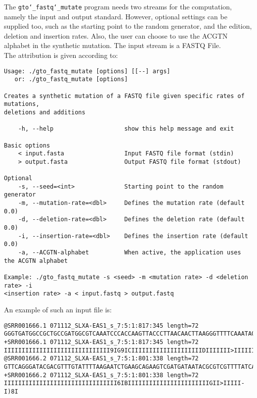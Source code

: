 The \texttt{gto\char`_fastq\char`_mutate} program needs two streams for the computation, namely the input and output standard. However, optional settings can be supplied too, such as the starting point to the random generator, and the edition, deletion and insertion rates. Also, the user can choose to use the ACGTN alphabet in the synthetic mutation. The input stream is a FASTQ File.\\
The attribution is given according to:
\begin{lstlisting}
Usage: ./gto_fastq_mutate [options] [[--] args]
   or: ./gto_fastq_mutate [options]

Creates a synthetic mutation of a FASTQ file given specific rates of mutations,
deletions and additions

    -h, --help                    show this help message and exit

Basic options
    < input.fasta                 Input FASTQ file format (stdin)
    > output.fasta                Output FASTQ file format (stdout)

Optional
    -s, --seed=<int>              Starting point to the random generator
    -m, --mutation-rate=<dbl>     Defines the mutation rate (default 0.0)
    -d, --deletion-rate=<dbl>     Defines the deletion rate (default 0.0)
    -i, --insertion-rate=<dbl>    Defines the insertion rate (default 0.0)
    -a, --ACGTN-alphabet          When active, the application uses the ACGTN alphabet

Example: ./gto_fastq_mutate -s <seed> -m <mutation rate> -d <deletion rate> -i 
<insertion rate> -a < input.fastq > output.fastq

\end{lstlisting}
An example of such an input file is:
\begin{lstlisting}
@SRR001666.1 071112_SLXA-EAS1_s_7:5:1:817:345 length=72
GGGTGATGGCCGCTGCCGATGGCGTCAAATCCCACCAAGTTACCCTTAACAACTTAAGGGTTTTCAAATAGA
+SRR001666.1 071112_SLXA-EAS1_s_7:5:1:817:345 length=72
IIIIIIIIIIIIIIIIIIIIIIIIIIIIII9IG9ICIIIIIIIIIIIIIIIIIIIIDIIIIIII>IIIIII/
@SRR001666.2 071112_SLXA-EAS1_s_7:5:1:801:338 length=72
GTTCAGGGATACGACGTTTGTATTTTAAGAATCTGAAGCAGAAGTCGATGATAATACGCGTCGTTTTATCAT
+SRR001666.2 071112_SLXA-EAS1_s_7:5:1:801:338 length=72
IIIIIIIIIIIIIIIIIIIIIIIIIIIIIIII6IBIIIIIIIIIIIIIIIIIIIIIIIGII>IIIII-I)8I
\end{lstlisting}


